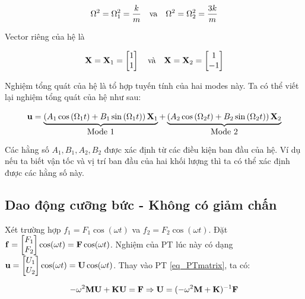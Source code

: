 \begin{equation}
    \Omega^2 =  \Omega_1^2 = \frac{k}{m} \quad \hbox{va} \quad \Omega^2 = \Omega_2^2 = \frac{3k}{m}
\end{equation}

Vector riêng của hệ là

\begin{equation}
    {\bf X} = {\bf X}_1 = \begin{bmatrix}
        1 \\ 1
    \end{bmatrix} \quad \hbox{và} \quad {\bf X} = {\bf X}_2 = \begin{bmatrix}
        1 \\ -1
    \end{bmatrix}
\end{equation}

Nghiệm tổng quát của hệ là tổ hợp tuyến tính của hai modes này. Ta có thể viết lại nghiệm tổng quát của hệ như sau:

\begin{equation}
    {\bf u}=\underbrace{\left(A_1 \cos \left(\Omega_1 t\right)+B_1 \sin \left(\Omega_1 t\right)\right) {\bf X}_1}_{\hbox{Mode 1}}+\underbrace{\left(A_2 \cos \left(\Omega_2 t\right)+B_2 \sin \left(\Omega_2 t\right)\right) {\bf X}_2}_{\hbox{Mode 2}}
\end{equation}

Các hằng số $A_1, B_1, A_2, B_2$ được xác định từ các điều kiện ban đầu của hệ. Ví dụ nếu ta biết vận tốc và vị trí ban đầu của hai khối lượng thì ta có thể xác định được các hằng số này.

\subsection{Dao động cưỡng bức - Không có giảm chấn}

Xét trường hợp $f_1 = F_1\cos(\omega t)$ va $f_2 = F_2\cos(\omega t)$. Đặt ${\bf f} = \begin{bmatrix} F_1 \\ F_2\end{bmatrix}\cos(\omega t) = {\bf F}\cos(\omega t)$. Nghiệm của PT lúc này có dạng ${\bf u} = \begin{bmatrix} U_1 \\ U_2\end{bmatrix}\cos(\omega t) = {\bf U}\cos(\omega t)$. Thay vào PT \cref{eq_PTmatrix}, ta có:

\begin{equation}
    -\omega^2{\bf M}{\bf U} + {\bf K}{\bf U} = {\bf F} \Rightarrow {\bf U} = (-\omega^2{\bf M}+{\bf K})^{-1} {\bf F}
\end{equation}

